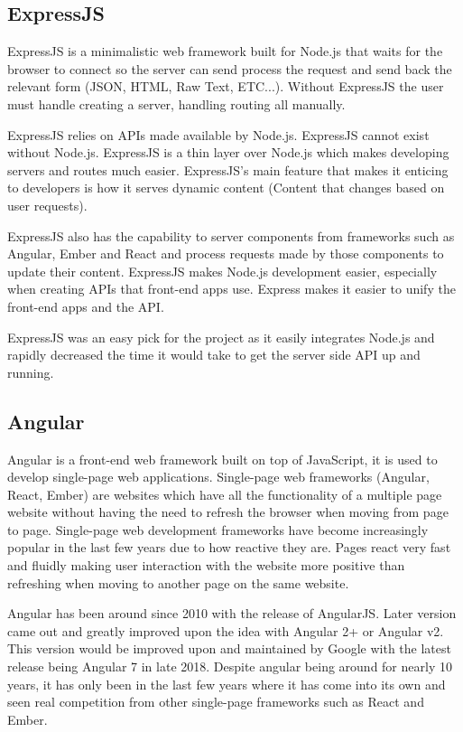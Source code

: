 \subsection{ExpressJS}
ExpressJS is a minimalistic web framework built for Node.js that waits for the browser to connect so the server can send process the request and send back the relevant form (JSON, HTML, Raw Text, ETC...). Without ExpressJS the user must handle creating a server, handling routing all manually.

ExpressJS relies on APIs made available by Node.js. ExpressJS cannot exist without Node.js. ExpressJS is a thin layer over Node.js which makes developing servers and routes much easier. ExpressJS's main feature that makes it enticing to developers is how it serves dynamic content (Content that changes based on user requests). 

ExpressJS also has the capability to server components from frameworks such as Angular, Ember and React and process requests made by those components to update their content. ExpressJS makes Node.js development easier, especially when creating APIs that front-end apps use. Express makes it easier to unify the front-end apps and the API.

ExpressJS was an easy pick for the project as it easily integrates Node.js and rapidly decreased the time it would take to get the server side API up and running.

\subsection{Angular}
Angular is a front-end web framework built on top of JavaScript, it is used to develop single-page web applications. Single-page web frameworks (Angular, React, Ember) are websites which have all the functionality of a multiple page website without having the need to refresh the browser when moving from page to page. Single-page web development frameworks have become increasingly popular in the last few years due to how reactive they are. Pages react very fast and fluidly making user interaction with the website more positive than refreshing when moving to another page on the same website. 

Angular has been around since 2010 with the release of AngularJS. Later version came out and greatly improved upon the idea with Angular 2+ or Angular v2. This version would be improved upon and maintained by Google with the latest release being Angular 7 in late 2018. Despite angular being around for nearly 10 years, it has only been in the last few years where it has come into its own and seen real competition from other single-page frameworks such as React and Ember.

